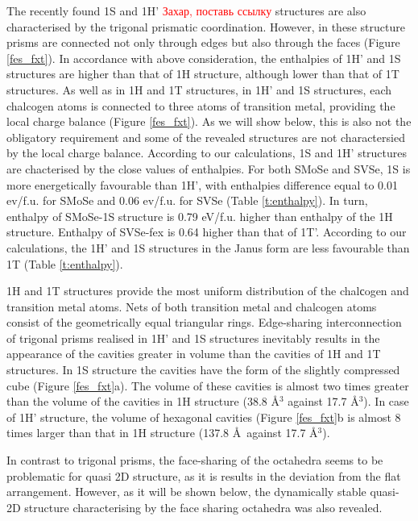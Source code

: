 \documentclass[a4paperm]{article}
\begin{document}
The recently found 1S and 1H' \cite{} \textcolor{red}{Захар, поставь ссылку} structures are also characterised by the trigonal prismatic coordination.
However, in these structure prisms are connected not only through edges but also through the faces (Figure \ref{fes_fxt}).
In accordance with above consideration, the enthalpies of 1H' and 1S structures are higher than that of 1H structure, although lower than that of 1T structures.
As well as in 1H and 1T structures, in 1H' and 1S structures,  each chalcogen atoms is connected to three atoms of transition metal, providing the local charge balance (Figure \ref{fes_fxt}).
As we will show below, this is also not the obligatory requirement and some of the revealed structures are not charactersied by the local charge balance.
According to our calculations, 1S and 1H' structures are chacterised by the close values of enthalpies.
For both SMoSe and SVSe, 1S is more energetically favourable than 1H', with enthalpies difference equal to 0.01 ev/f.u. for SMoSe and 0.06 ev/f.u. for SVSe (Table \ref{t:enthalpy}).
In turn, enthalpy of SMoSe-1S structure is 0.79 eV/f.u. higher than enthalpy of the 1H structure.
Enthalpy of SVSe-fex is 0.64 higher than that of 1T'.
According to our calculations, the 1H' and 1S structures in the Janus form are less favourable than 1T (Table \ref{t:enthalpy}).

1H and 1T structures provide the most uniform distribution of the chalсogen and transition metal atoms.
Nets of  both transition metal and chalcogen atoms consist of the geometrically equal triangular rings.
Edge-sharing interconnection of trigonal prisms realised in 1H' and 1S structures inevitably results in the appearance of the cavities greater in volume than the cavities of 1H and 1T structures. 
In 1S structure the cavities have the form of the slightly compressed cube (Figure \ref{fes_fxt}a).
The volume of these cavities is almost two times greater than the volume of the cavities in 1H structure (38.8 \AA$^3$ against 17.7 \AA$^3$).
In case of 1H' structure, the volume of hexagonal cavities (Figure \ref{fes_fxt}b is almost 8 times larger than that in 1H structure (137.8 \AA\ against 17.7 \AA$^3$).

In contrast to trigonal prisms, the face-sharing of the octahedra seems to be problematic for quasi 2D structure, as it is results in the deviation from the flat arrangement.
However, as it will be shown below, the dynamically stable quasi-2D structure characterising by the face sharing octahedra was also revealed.
\end{document}

